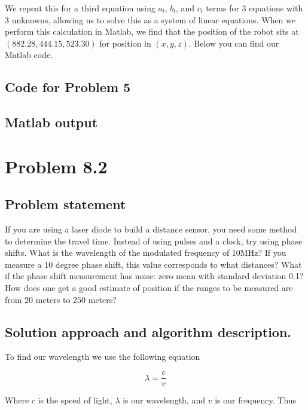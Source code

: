 \documentclass[letterpaper,11pt]{texMemo} %
\begin{document}
We repeat this for a third equation using $a_l$, $b_l$, and $c_l$ terms for 3 equations with 3 unknowns, allowing 
us to solve this as a system of linear equations. When we perform this calculation in Matlab, we find that 
the position of the robot sits at $(882.28, 444.15, 523.30)$ for position in $(x,y,z)$. Below you can find our Matlab
code.


\newpage
\subsection*{Code for Problem 5}
\begin{tiny}

\end{tiny}

\subsection*{Matlab output}
\begin{tiny}

\end{tiny}

\newpage
\section*{Problem 8.2}
\subsection*{Problem statement}
If you are using a laser diode to build a distance sensor, you need some method to determine the
travel time. Instead of using pulses and a clock, try using phase shifts. What is the wavelength 
of the modulated frequency of 10MHz? If you measure a 10 degree phase shift, this value corresponds 
to what distances? What if the phase shift measurement has noise: zero mean with standard deviation 
0.1? How does one get a good estimate of position if the ranges to be measured are from 20 meters 
to 250 meters?

\subsection*{Solution approach and algorithm description.}

To find our wavelength we use the following equation

\[
    \lambda = \frac{c}{v}
\]

Where $c$ is the speed of light, $\lambda$ is our wavelength, and $v$ is our frequency. Thus
\end{document}
